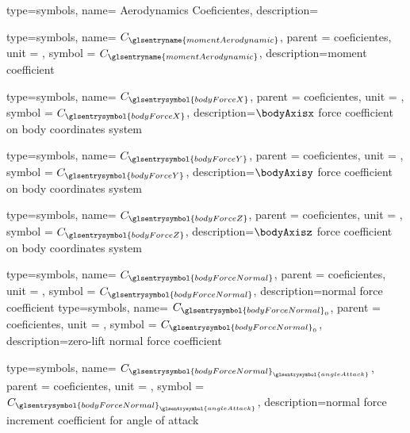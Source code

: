 {type=symbols,
    name= {Aerodynamics Coeficientes},
    description={}
}

{type=symbols,
    name= \ensuremath{C_{\glsentryname{momentAerodynamic}}},
    parent = {coeficientes},
    unit = \unexpanded{},
    symbol = \ensuremath{C_{\glsentryname{momentAerodynamic}}},
    description={moment coefficient}
}

{type=symbols,
    name= \ensuremath{C_{\glsentrysymbol{bodyForceX}}},
    parent = {coeficientes},
    unit = \unexpanded{},
    symbol = \ensuremath{C_{\glsentrysymbol{bodyForceX}}},
    description={$\bodyAxisx$ force coefficient on body coordinates system }
}

{type=symbols,
    name= \ensuremath{C_{\glsentrysymbol{bodyForceY}}},
    parent = {coeficientes},
    unit = \unexpanded{},
    symbol = \ensuremath{C_{\glsentrysymbol{bodyForceY}}},
    description={$\bodyAxisy$ force coefficient on body coordinates system }
}

{type=symbols,
    name= \ensuremath{C_{\glsentrysymbol{bodyForceZ}}},
    parent = {coeficientes},
    unit = \unexpanded{},
    symbol = \ensuremath{C_{\glsentrysymbol{bodyForceZ}}},
    description={$\bodyAxisz$ force coefficient on body coordinates system }
}

{type=symbols,
    name= \ensuremath{C_{\glsentrysymbol{bodyForceNormal}}},
    parent = {coeficientes},
    unit = \unexpanded{},
    symbol = \ensuremath{C_{\glsentrysymbol{bodyForceNormal}}},
    description={normal force coefficient}
}
{type=symbols,
    name= \ensuremath{C_{\glsentrysymbol{bodyForceNormal}_{0}}},
    parent = {coeficientes},
    unit = \unexpanded{},
    symbol = \ensuremath{C_{\glsentrysymbol{bodyForceNormal}_{0}}},
    description={zero-lift normal force coefficient}
}

{type=symbols,
    name= \ensuremath{C_{{\glsentrysymbol{bodyForceNormal}}_{\glsentrysymbol{angleAttack}}}},
    parent = {coeficientes},
    unit = \unexpanded{},
    symbol = \ensuremath{C_{{\glsentrysymbol{bodyForceNormal}}_{\glsentrysymbol{angleAttack}}}},
    description={normal force increment coefficient for angle of attack}
}

